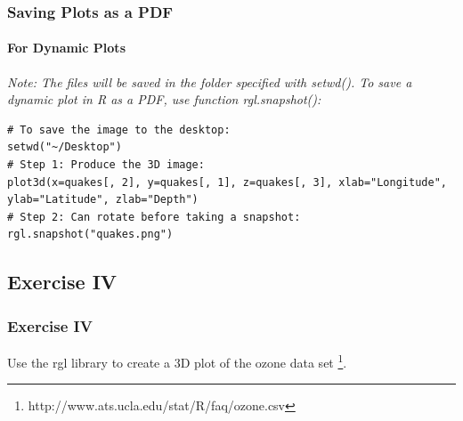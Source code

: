 \begin{frame}[fragile]
\frametitle{Saving Plots as a PDF}
\framesubtitle{For Dynamic Plots}

\itshape Note: \normalfont The files will be saved in the folder specified with \ttfamily setwd(). \normalfont
To save a dynamic plot in \ttfamily R \normalfont as a PDF, use function \ttfamily rgl.snapshot(): \normalfont

\begin{lstlisting}
# To save the image to the desktop:
setwd("~/Desktop")
# Step 1: Produce the 3D image:
plot3d(x=quakes[, 2], y=quakes[, 1], z=quakes[, 3], xlab="Longitude", ylab="Latitude", zlab="Depth")
# Step 2: Can rotate before taking a snapshot:
rgl.snapshot("quakes.png")
\end{lstlisting}

\end{frame}



\subsection{Exercise IV}
\begin{frame}
	\frametitle{Exercise IV}
	Use the \ttfamily rgl \normalfont library to create a 3D plot of the \ttfamily ozone \normalfont data set \footnote{\ttfamily http://www.ats.ucla.edu/stat/R/faq/ozone.csv\normalfont}.
\end{frame}